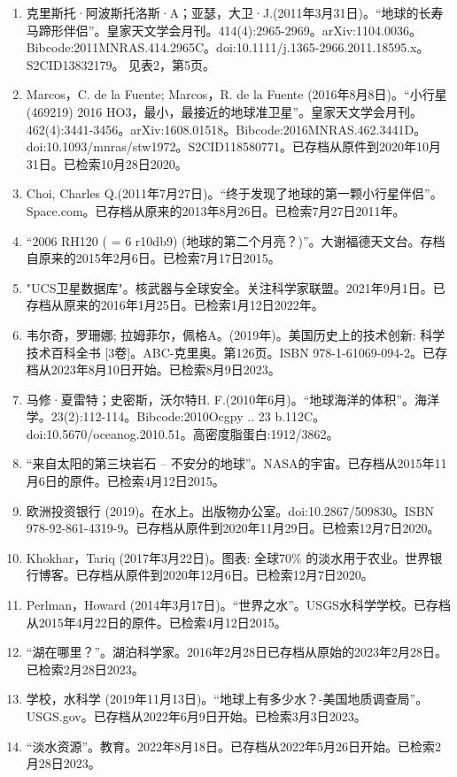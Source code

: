 \begin{enumerate}
\item 克里斯托·阿波斯托洛斯·A；亚瑟，大卫·J.(2011年3月31日)。“地球的长寿马蹄形伴侣”。皇家天文学会月刊。414(4):2965-2969。arXiv:1104.0036。Bibcode:2011MNRAS.414.2965C。doi:10.1111/j.1365-2966.2011.18595.x。S2CID13832179。 见表2，第5页。
\item Marcos，C. de la Fuente; Marcos，R. de la Fuente (2016年8月8日)。“小行星 (469219) 2016 HO3，最小，最接近的地球准卫星”。皇家天文学会月刊。462(4):3441-3456。arXiv:1608.01518。Bibcode:2016MNRAS.462.3441D。doi:10.1093/mnras/stw1972。S2CID118580771。已存档从原件到2020年10月31日。已检索10月28日2020。 
\item Choi, Charles Q.(2011年7月27日)。“终于发现了地球的第一颗小行星伴侣”。Space.com。已存档从原来的2013年8月26日。已检索7月27日2011年。
\item “2006 RH120 ( = 6 r10db9) (地球的第二个月亮？)”。大谢福德天文台。存档自原来的2015年2月6日。已检索7月17日2015。
\item "UCS卫星数据库"。核武器与全球安全。关注科学家联盟。2021年9月1日。已存档从原来的2016年1月25日。已检索1月12日2022年。
\item 韦尔奇，罗珊娜; 拉姆菲尔，佩格A。(2019年)。美国历史上的技术创新: 科学技术百科全书 [3卷]。ABC-克里奥。第126页。ISBN 978-1-61069-094-2。已存档从2023年8月10日开始。已检索8月9日2023。
\item 马修·夏雷特；史密斯，沃尔特H. F.(2010年6月)。“地球海洋的体积”。海洋学。23(2):112-114。Bibcode:2010Ocgpy .. 23 b.112C。doi:10.5670/oceanog.2010.51。高密度脂蛋白:1912/3862。
\item “来自太阳的第三块岩石 -- 不安分的地球”。NASA的宇宙。已存档从2015年11月6日的原件。已检索4月12日2015。
\item 欧洲投资银行 (2019)。在水上。出版物办公室。doi:10.2867/509830。ISBN 978-92-861-4319-9。已存档从原件到2020年11月29日。已检索12月7日2020。
\item Khokhar，Tariq (2017年3月22日)。图表: 全球70\% 的淡水用于农业。世界银行博客。已存档从原件到2020年12月6日。已检索12月7日2020。
\item Perlman，Howard (2014年3月17日)。“世界之水”。USGS水科学学校。已存档从2015年4月22日的原件。已检索4月12日2015。
\item “湖在哪里？”。湖泊科学家。2016年2月28日已存档从原始的2023年2月28日。已检索2月28日2023。
\item  学校，水科学 (2019年11月13日)。“地球上有多少水？-美国地质调查局”。USGS.gov。已存档从2022年6月9日开始。已检索3月3日2023。
\item “淡水资源”。教育。2022年8月18日。已存档从2022年5月26日开始。已检索2月28日2023。

\end{enumerate}
